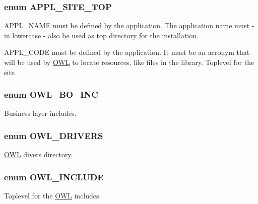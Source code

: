 \subsubsection[{APPL\_\-SITE\_\-TOP}]{\setlength{\rightskip}{0pt plus 5cm}enum {\bf APPL\_\-SITE\_\-TOP}}\label{OWLloader_8php_a17a0c6fb6eda7d05081d16bc519c97b5}


APPL\_\-NAME must be defined by the application. The application name must -\/ in lowercase -\/ also be used as top directory for the installation. 

APPL\_\-CODE must be defined by the application. It must be an acronym that will be used by \hyperlink{classOWL}{OWL} to locate resources, like files in the library. Toplevel for the site 
\subsubsection[{OWL\_\-BO\_\-INC}]{\setlength{\rightskip}{0pt plus 5cm}enum {\bf OWL\_\-BO\_\-INC}}\label{OWLloader_8php_aca50646bc73c3addf0e0f25081eae0ae}


Business layer includes. 

\subsubsection[{OWL\_\-DRIVERS}]{\setlength{\rightskip}{0pt plus 5cm}enum {\bf OWL\_\-DRIVERS}}\label{OWLloader_8php_af6ffde4ef80c21c2e105c89dab9c011e}


\hyperlink{classOWL}{OWL} divers directory. 

\subsubsection[{OWL\_\-INCLUDE}]{\setlength{\rightskip}{0pt plus 5cm}enum {\bf OWL\_\-INCLUDE}}\label{OWLloader_8php_a4d33a8f2fcc9c83cbeea921c4cb23a7f}


Toplevel for the \hyperlink{classOWL}{OWL} includes. 

